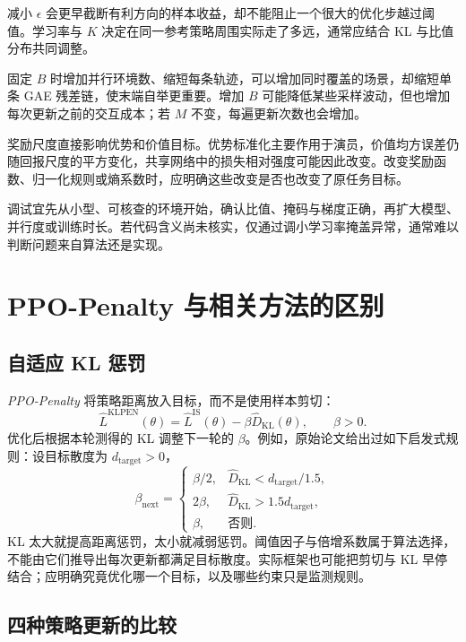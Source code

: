 \documentclass[UTF8,12pt,a4paper,fontset=fandol]{ctexart}
\begin{document}
减小 $\epsilon$ 会更早截断有利方向的样本收益，却不能阻止一个很大的优化步越过阈值。学习率与 $K$ 决定在同一参考策略周围实际走了多远，通常应结合 KL 与比值分布共同调整。

固定 $B$ 时增加并行环境数、缩短每条轨迹，可以增加同时覆盖的场景，却缩短单条 GAE 残差链，使末端自举更重要。增加 $B$ 可能降低某些采样波动，但也增加每次更新之前的交互成本；若 $M$ 不变，每遍更新次数也会增加。

奖励尺度直接影响优势和价值目标。优势标准化主要作用于演员，价值均方误差仍随回报尺度的平方变化，共享网络中的损失相对强度可能因此改变。改变奖励函数、归一化规则或熵系数时，应明确这些改变是否也改变了原任务目标。

调试宜先从小型、可核查的环境开始，确认比值、掩码与梯度正确，再扩大模型、并行度或训练时长。若代码含义尚未核实，仅通过调小学习率掩盖异常，通常难以判断问题来自算法还是实现。

\section{PPO-Penalty 与相关方法的区别}
\label{sec:ppo-variants}

\subsection{自适应 KL 惩罚}

\emph{PPO-Penalty} 将策略距离放入目标，而不是使用样本剪切：
\begin{equation}
  \widehat L^{\mathrm{KLPEN}}(\theta)
  =\widehat L^{\mathrm{IS}}(\theta)
   -\beta\widehat D_{\mathrm{KL}}(\theta),
  \qquad \beta>0.
  \label{eq:ppo-penalty}
\end{equation}
优化后根据本轮测得的 KL 调整下一轮的 $\beta$。例如，原始论文给出过如下启发式规则\cite{schulman-ppo}：设目标散度为 $d_{\mathrm{target}}>0$，
\[
  \beta_{\mathrm{next}}=
  \begin{cases}
    \beta/2,&\widehat D_{\mathrm{KL}}<d_{\mathrm{target}}/1.5,\\
    2\beta,&\widehat D_{\mathrm{KL}}>1.5d_{\mathrm{target}},\\
    \beta,&\text{否则}.
  \end{cases}
\]
KL 太大就提高距离惩罚，太小就减弱惩罚。阈值因子与倍增系数属于算法选择，不能由它们推导出每次更新都满足目标散度。实际框架也可能把剪切与 KL 早停结合；应明确究竟优化哪一个目标，以及哪些约束只是监测规则。

\subsection{四种策略更新的比较}
\end{document}
